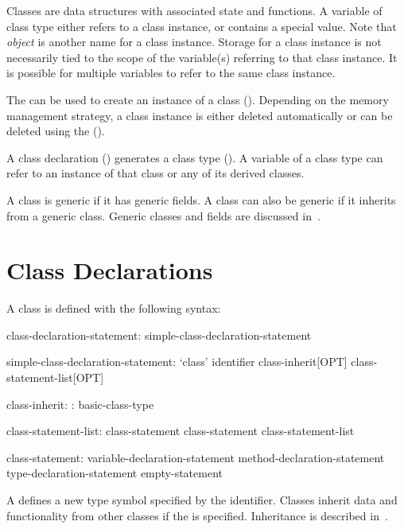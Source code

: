 \label{Classes}


Classes are data structures with associated state and functions.  A
variable of class type either refers to a class instance, or contains a
special  value. Note that \emph{object} is another name for a
class instance.  Storage for a class instance is not necessarily tied to
the scope of the variable(s) referring to that class instance. It is
possible for multiple variables to refer to the same class instance.

The  can be used to create an instance of a class
(). Depending on the memory management strategy, a class
instance is either deleted automatically or can be deleted using the
 ().

A class declaration () generates a class
type ().  A variable of a class type can refer to an
instance of that class or any of its derived classes.

A class is generic if it has generic fields. A class can also
be generic if it inherits from a generic class. Generic classes and fields
are discussed in~.

\section{Class Declarations}
\label{Class_Declarations}

A class is defined with the following syntax:
\begin{syntax}
class-declaration-statement:
  simple-class-declaration-statement

simple-class-declaration-statement:
  `class' identifier class-inherit[OPT] { class-statement-list[OPT] }

class-inherit:
  : basic-class-type

class-statement-list:
  class-statement
  class-statement class-statement-list

class-statement:
  variable-declaration-statement
  method-declaration-statement
  type-declaration-statement
  empty-statement
\end{syntax}

A  defines a new type symbol
specified by the identifier.  Classes inherit data and functionality
from other classes %
if the  is specified.
Inheritance is described in~.

